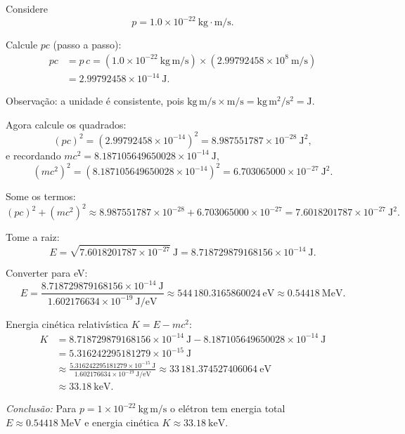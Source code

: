 \documentclass[12pt,a4paper]{article}
\begin{document}
Considere
\[
p = 1.0\times 10^{-22}\ \mathrm{kg\cdot m/s}.
\]

Calcule \(pc\) (passo a passo):
\begin{align*}
pc &= p\,c
= (1.0\times 10^{-22}\ \mathrm{kg\,m/s})\times(2.99792458\times 10^8\ \mathrm{m/s}) \\
   &= 2.99792458\times 10^{-14}\ \mathrm{J}.
\end{align*}

Observação: a unidade é consistente, pois \(\mathrm{kg\,m/s}\times\mathrm{m/s}=\mathrm{kg\,m^2/s^2}=\mathrm{J}\).

Agora calcule os quadrados:
\[
(pc)^2 = (2.99792458\times 10^{-14})^2 = 8.987551787\times 10^{-28}\ \mathrm{J}^2,
\]
e recordando \(mc^2 = 8.187105649650028\times 10^{-14}\ \mathrm{J}\),
\[
(mc^2)^2 = (8.187105649650028\times 10^{-14})^2 = 6.703065000\times 10^{-27}\ \mathrm{J}^2.
\]

Some os termos:
\[
(pc)^2 + (mc^2)^2 \approx 8.987551787\times 10^{-28} + 6.703065000\times 10^{-27}
= 7.6018201787\times 10^{-27}\ \mathrm{J}^2.
\]

Tome a raiz:
\[
E = \sqrt{7.6018201787\times 10^{-27}}\ \mathrm{J}
= 8.718729879168156\times 10^{-14}\ \mathrm{J}.
\]

Converter para eV:
\[
E = \frac{8.718729879168156\times 10^{-14}\ \mathrm{J}}{1.602176634\times 10^{-19}\ \mathrm{J/eV}}
\approx 544\,180.3165860024\ \mathrm{eV} \approx 0.54418\ \mathrm{MeV}.
\]

Energia cinética relativística \(K = E - mc^2\):
\begin{align*}
K &= 8.718729879168156\times 10^{-14}\ \mathrm{J} - 8.187105649650028\times 10^{-14}\ \mathrm{J} \\
  &= 5.316242295181279\times 10^{-15}\ \mathrm{J} \\
  &\approx \frac{5.316242295181279\times 10^{-15}\ \mathrm{J}}{1.602176634\times 10^{-19}\ \mathrm{J/eV}}
  \approx 33\,181.374527406064\ \mathrm{eV} \\
  &\approx 33.18\ \mathrm{keV}.
\end{align*}

\emph{Conclusão:} Para \(p=1\times10^{-22}\ \mathrm{kg\,m/s}\) o elétron tem energia total \(E\approx 0.54418\ \mathrm{MeV}\) e energia cinética \(K\approx 33.18\ \mathrm{keV}.\)

\end{document}
